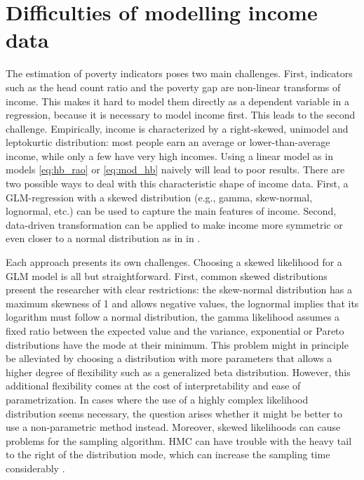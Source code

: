 \section{Difficulties of modelling income data}
\label{ch:difficulties}
The estimation of poverty indicators poses two main challenges.
First, indicators such as the head count ratio and the poverty gap are non-linear transforms of income.
This makes it hard to model them directly as a dependent variable in a regression, because it is necessary to model income first.
This leads to the second challenge.
Empirically, income is characterized by a right-skewed, unimodel and leptokurtic distribution:
most people earn an average or lower-than-average income, while only a few have very high incomes.
Using a linear model as in models \ref{eq:hb_rao} or \ref{eq:mod_hb} naively will lead to poor results.
There are two possible ways to deal with this characteristic shape of income data.
First, a GLM-regression with a skewed distribution (e.g., gamma, skew-normal, lognormal, etc.) can be used to capture the main features of income.
Second, data-driven transformation can be applied to make income more symmetric or even closer to a normal distribution as in in \cite{rojas_perilla_data_2020}.

Each approach presents its own challenges.
Choosing a skewed likelihood for a GLM model is all but straightforward.
First, common skewed distributions present the researcher with clear restrictions:
the skew-normal distribution has a maximum skewness of 1 and allows negative values, the lognormal implies that its logarithm must follow a normal distribution, the gamma likelihood assumes a fixed ratio between the expected value and the variance, exponential or Pareto distributions have the mode at their minimum.
This problem might in principle be alleviated by choosing a distribution with more parameters that allows a higher degree of flexibility such as a generalized beta distribution.
However, this additional flexibility comes at the cost of interpretability and ease of parametrization.
In cases where the use of a highly complex likelihood distribution seems necessary, the question arises whether it might be better to use a non-parametric method instead.
Moreover, skewed likelihoods can cause problems for the sampling algorithm. HMC can have trouble with the heavy tail to the right of the distribution mode, which can increase the sampling time considerably \citep{betancourt_conceptual_2017}.

